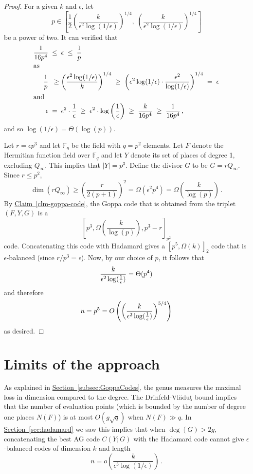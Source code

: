 \documentclass[10pt]{article}
\theoremstyle{definition}
\numberwithin{equation}{section}
\newcommand{\expref}[2]{\texorpdfstring{\hyperref[#2]{#1~\ref{#2}}}{#1~\ref{#2}}}
\newcommand{\Fq}{{\mathbb{F}_q}}
\newcommand{\half}{\frac{1}{2}}
\newcommand{\eps}{\epsilon}
\newcommand{\logeps}{\log({1 \over \epsilon})}
\newcommand{\Pl}{{Y}}
\begin{document}
\begin{proof}
For a given $k$ and $\eps$, let $$p \in \left[\half
\left(\frac{k}{\eps^2 \log(1/\eps)}\right)^{1/4}, \;
\left(\frac{k}{\eps^2 \log(1/\eps)}\right)^{1/4}\right]$$ be a power
of two. It can verified that 
\begin{align*}
\frac{1}{16p^4}\; &\le\; \eps \;\le\;
\frac{1}{p}\\
\intertext{as}
  \frac{1}{p} \;&\;\ge \left(\frac{\eps^2 \log(1/\eps)}{k}\right)^{1/4} \;\ge\;
\left(\eps^2 \log(1/\eps) \cdot \frac{\eps^2}{\log(1/\eps)}\right)^{1/4}
\;=\; \eps\\
\intertext{and}
  \eps \;&=\; \eps^2 \cdot \frac{1}{\eps} \;\ge\; \eps^2 \cdot \log\left(\frac{1}{\epsilon}\right)
\;\ge\; \frac{k}{16 p^4} \;\ge\; \frac{1}{16 p^4}\,,
\end{align*}
and so $\log(1/\eps) = \Theta(\log(p))$.
%
%
%
%
%
%
%

Let $r=\eps p^3$ and let $\Fq $ be the field with $q=p^2$ elements.
Let $F$ denote the Hermitian function field over $\Fq $ and let
$\Pl$ denote its set of places of degree 1, excluding $Q_\infty$.
This implies that $|\Pl| = p^3$. Define the divisor $G$ to be $G =
rQ_\infty$. Since $r \le p^2$,
$$\dim (r Q_\infty) \ge \left(\frac{r}{2(p+1)}\right)^2 = \Omega\left(\eps^2
p^4\right)=\Omega\left(\frac{k}{\log(p)}\right)\,.$$ By
\expref{Claim}{clm-goppa-code}, the Goppa code that is obtained from the
triplet $(F, \Pl, G)$ is a
$$\left[p^3,\Omega\left(\frac{k}{\log(p)}\right),p^3 - r\right]_{p^2}$$ code. Concatenating this code with Hadamard gives a $[p^5,\Omega({k})]_2$ code that is $\eps$-balanced (since
${r}/{p^3}=\eps$). Now, by our choice of $p$, it follows that
$${k \over \eps^2 \logeps} = \Theta(p^4)$$ and therefore 
\[
n=p^5
=O\left(\left(\frac{k}{\eps^2 \logeps}\right)^{5/4}\right)
\]
as desired.
\end{proof}



\section{Limits of the approach}
\label{sec:voloch}

As explained in \expref{Section}{subsec:GoppaCodes}, the genus measures
the maximal loss in dimension compared to the degree. The
Drinfeld-Vl\u{a}du\c{t} bound implies that the number of evaluation
points (which is bounded by the number of degree one places $N(F)$)
is at most $O(g \sqrt{q})$ when $N(F) \gg q$. In
\expref{Section}{sec:hadamard} we saw this implies that when $\deg(G) >
2g$, concatenating the best AG code $C(Y;G)$ with the Hadamard code
cannot give $\eps$-balanced codes of dimension $k$ and length
\[
n=o\left(\frac{k}{\eps^3 \log(1/\eps)}\right)\,.
\]
\end{document}
